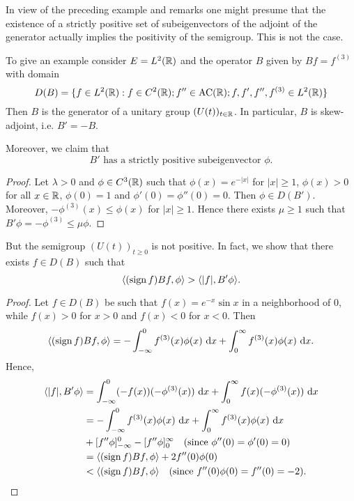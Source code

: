 In view of the preceding example and remarks one might presume that the existence of a strictly positive set of subeigenvectors of the adjoint of the generator actually implies the positivity of the semigroup. 
This is not the case.

To give an example consider $E = L^{2}(\mathbb{R})$ and the operator $B$ given by
$Bf = f^{(3)}$ with domain
\begin{equation*}
D(B) = \{f \in L^{2}(\mathbb{R}) : f \in C^{2}(\mathbb{R}) ; f'' \in \text{AC}(\mathbb{R}) ; f,f',f'',f^{(3)} \in L^{2}(\mathbb{R})\}
\end{equation*}
Then $B$ is the generator of a unitary group $(U(t))_{t \in \mathbb{R}}$. 
In particular, $B$ is skew-adjoint, i.e. $B' = -B$.

Moreover, we claim that
\begin{equation}\label{eq:c2-3.18}
B' \text{ has a strictly positive subeigenvector } \phi.
\end{equation}

\begin{proof}
Let $\lambda > 0$ and $\phi \in C^{3}(\mathbb{R})$ such that $\phi(x) = e^{-|x|}$ for
$|x| \geq 1$, $\phi(x) > 0$ for all $x \in \mathbb{R}$, $\phi(0) = 1$ and $\phi'(0) = \phi''(0) = 0$.
Then $\phi \in D(B')$. 
Moreover, $-\phi^{(3)}(x) \leq \phi(x)$ for $|x| \geq 1$. 
Hence there exists $\mu \geq 1$ such that $B'\phi = -\phi^{(3)} \leq \mu\phi$.
\end{proof}

But the semigroup $(U(t))_{t \geq 0}$ is not positive. 
In fact, we show that there exists $f \in D(B)$ such that
\begin{equation}\label{eq:c2-3.19}
\langle(\operatorname{sign}  f)Bf,\phi\rangle > \langle|f|,B'\phi\rangle.
\end{equation}

\begin{proof}
Let $f \in D(B)$ be such that $f(x) = e^{-x} \sin x$ in a neighborhood of $0$, while $f(x) > 0$ for $x > 0$ and $f(x) < 0$ for $x < 0$. 
Then
\begin{align*}
\langle(\operatorname{sign}  f)Bf,\phi\rangle = - \int_{-\infty}^{0} f^{(3)}(x)\phi(x) \, \mathop{}\!\mathrm{d}{x} + \int_{0}^{\infty} f^{(3)}(x)\phi(x) \, \mathop{}\!\mathrm{d}{x}.
\end{align*}
Hence, 
\begin{align*}
\langle|f|,B'\phi\rangle &= \int_{-\infty}^{0} (-f(x))(-\phi^{(3)}(x)) \, \mathop{}\!\mathrm{d}{x} + \int_{0}^{\infty} f(x)(-\phi^{(3)}(x)) \, \mathop{}\!\mathrm{d}{x}\\
&= - \int_{-\infty}^{0} f^{(3)}(x)\phi(x) \, \mathop{}\!\mathrm{d}{x} + \int_{0}^{\infty} f^{(3)}(x)\phi(x) \, \mathop{}\!\mathrm{d}{x}\\
&+ [f''\phi]_{-\infty}^{0} - [f''\phi]_{0}^{\infty} \quad \text{(since $\phi''(0)=\phi'(0)=0$)}\\
&= \langle(\operatorname{sign}  f) Bf,\phi\rangle + 2f''(0)\phi(0)\\
&< \langle(\operatorname{sign}  f) Bf,\phi\rangle \quad \text{(since $f''(0)\phi(0) = f''(0) = -2$)}.
\end{align*}
\end{proof}

